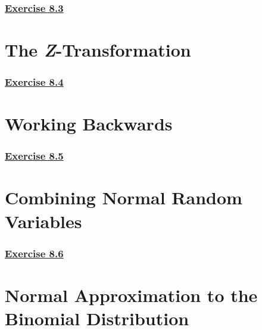 \documentclass[
  11pt,
]{book}
\begin{document}
\subsubsection*{\texorpdfstring{\hyperref[ex83a]{Exercise 8.3}}{Exercise 8.3}}\label{exercise-8.3}

\section{\texorpdfstring{The \textit{Z}-Transformation}{The -Transformation}}\label{the--transformation}

\subsubsection*{\texorpdfstring{\hyperref[ex84a]{Exercise 8.4}}{Exercise 8.4}}\label{exercise-8.4}

\section{Working Backwards}\label{working-backwards}

\subsubsection*{\texorpdfstring{\hyperref[ex85a]{Exercise 8.5}}{Exercise 8.5}}\label{exercise-8.5}

\section{Combining Normal Random Variables}\label{combining-normal-random-variables}

\subsubsection*{\texorpdfstring{\hyperref[ex86a]{Exercise 8.6}}{Exercise 8.6}}\label{exercise-8.6}

\section{Normal Approximation to the Binomial Distribution}\label{normal-approximation-to-the-binomial-distribution}
\end{document}

